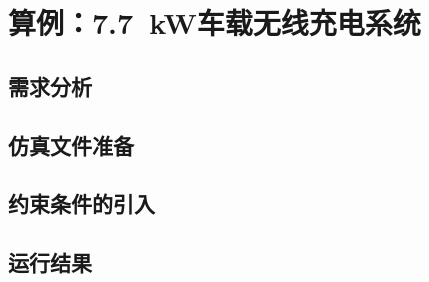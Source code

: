 \documentclass[index]{subfiles}
\begin{document}
\chapter{算例：\SI{7.7}{\kilo\watt}车载无线充电系统}\label{sec:example}
\section{需求分析}
\section{仿真文件准备}
\section{约束条件的引入}
\section{运行结果}
\end{document}
